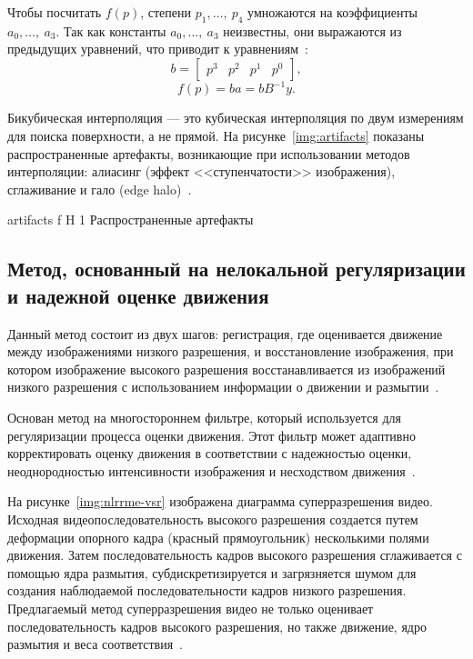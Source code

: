 \documentclass{bmstu}
\begin{document}
Чтобы посчитать $f(p)$, степени $p_1,\dots,~p_4$ умножаются на коэффициенты $a_0,\dots,~a_3$. 
Так как константы $a_0,\dots,~a_3$ неизвестны, они выражаются из предыдущих уравнений, что приводит к уравнениям~\cite{Bavenstrand2021}:
\begin{equation}
b = \begin{bmatrix}
p^3 & p^2 & p^1 & p^0
\end{bmatrix},
\end{equation}
\begin{equation}
f(p) = ba = bB^{-1}y.
\end{equation}

Бикубическая интерполяция --- это кубическая интерполяция по двум измерениям для поиска поверхности, а не прямой. 
На рисунке~\ref{img:artifacts} показаны распространенные артефакты, возникающие при использовании методов интерполяции: алиасинг (эффект <<ступенчатости>> изображения), сглаживание и гало (edge halo)~\cite{Bavenstrand2021}.

    {artifacts}
    {f}
    {H}
    {1\textwidth}
    {Распространенные артефакты~\cite{Bavenstrand2021}}

\subsection{Метод, основанный на нелокальной регуляризации и надежной оценке движения}

Данный метод состоит из двух шагов: регистрация, где оценивается движение между изображениями низкого разрешения, и восстановление изображения, при котором изображение высокого разрешения восстанавливается из изображений низкого разрешения с использованием информации о движении и размытии~\cite{Jian2014}.

Основан метод на многостороннем фильтре, который используется для регуляризации процесса оценки движения. 
Этот фильтр может адаптивно корректировать оценку движения в соответствии с надежностью оценки, неоднородностью интенсивности изображения и несходством движения~\cite{Jian2014}.

На рисунке~\ref{img:nlrrme-vsr} изображена диаграмма суперразрешения видео. 
Исходная видеопоследовательность высокого разрешения создается путем деформации опорного кадра (красный прямоугольник) несколькими полями движения. 
Затем последовательность кадров высокого разрешения сглаживается с помощью ядра размытия, субдискретизируется и загрязняется шумом для создания наблюдаемой последовательности кадров низкого разрешения. 
Предлагаемый метод суперразрешения видео не только оценивает последовательность кадров высокого разрешения, но также движение, ядро размытия и веса соответствия~\cite{Jian2014}.
\end{document}
